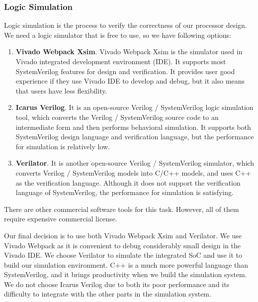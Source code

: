 \subsubsection{Logic Simulation}
Logic simulation is the process to verify the correctness of our processor design. We need a logic simulator that is free to use, so we have following options:
\begin{enumerate}
    \item \textbf{Vivado Webpack Xsim}. Vivado Webpack Xsim is the simulator used in Vivado integrated development environment (IDE). It supports most SystemVerilog features for design and verification. It provides user good experience if they use Vivado IDE to develop and debug, but it also means that users have less flexibility.
    \item \textbf{Icarus Verilog}. It is an open-source Verilog / SystemVerilog logic simulation tool, which converts the Verilog / SystemVerilog source code to an intermediate form and then performs behavioral simulation. It supports both SystemVerilog design language and verification language, but the performance for simulation is relatively low.
    \item \textbf{Verilator}. It is another open-source Verilog / SystemVerilog simulator, which converts Verilog / SystemVerilog models into C/C++ models, and uses C++ as the verification language. Although it does not support the verification language of SystemVerilog, the performance for simulation is satisfying.
\end{enumerate}
There are other commercial software tools for this task. However, all of them require expensive commercial license.

Our final decision is to use both Vivado Webpack Xsim and Verilator. We use Vivado Webpack as it is convenient to debug considerably small design in the Vivado IDE. We choose Verilator to simulate the integrated SoC and use it to build our simulation environment. C++ is a much more powerful language than SystemVerilog, and it brings productivity when we build the simulation system. We do not choose Icarus Verilog due to both its poor performance and its difficulty to integrate with the other parts in the simulation system.

